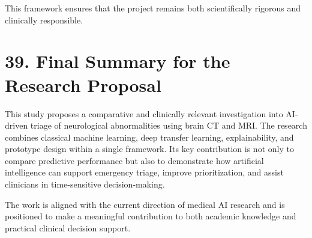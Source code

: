 \documentclass[12pt,a4paper]{report}
\begin{document}
This framework ensures that the project remains both scientifically rigorous and clinically responsible.


\section{39. Final Summary for the Research Proposal}

This study proposes a comparative and clinically relevant investigation into AI-driven triage of neurological abnormalities using brain CT and MRI. The research combines classical machine learning, deep transfer learning, explainability, and prototype design within a single framework. Its key contribution is not only to compare predictive performance but also to demonstrate how artificial intelligence can support emergency triage, improve prioritization, and assist clinicians in time-sensitive decision-making.

The work is aligned with the current direction of medical AI research and is positioned to make a meaningful contribution to both academic knowledge and practical clinical decision support.
\end{document}
